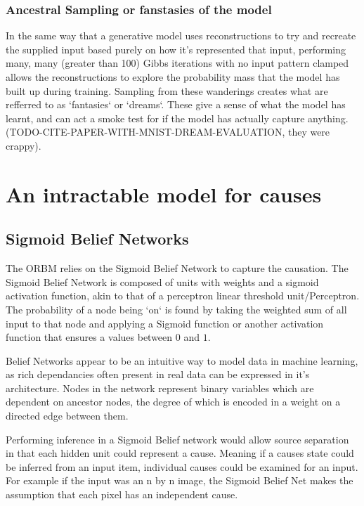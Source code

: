   \subsubsection{Ancestral Sampling or fanstasies of the model}
  \todo%
  In the same way that a generative model uses reconstructions to try and recreate the  supplied input based purely on how it's represented that input, performing many, many (greater than 100) Gibbs iterations with no input pattern clamped allows the reconstructions to explore the probability mass that the model has built up during training. Sampling from these wanderings creates what are refferred to as `fantasies` or `dreams`. These give a sense of what the model has learnt, and can act a smoke test for if the model has actually capture anything.
  (TODO-CITE-PAPER-WITH-MNIST-DREAM-EVALUATION, they were crappy).

  \section{An intractable model for causes}
    \subsection{Sigmoid Belief Networks}
    \todo%

    The ORBM relies on the Sigmoid Belief Network to capture the causation. The Sigmoid Belief Network is composed of units with weights and a sigmoid activation function, akin to that of a perceptron linear threshold unit/Perceptron. The probability of a node being `on` is found by taking the weighted sum of all input to that node and applying a Sigmoid function or another activation function that ensures a values between $0$ and $1$.

    Belief Networks appear to be an intuitive way to model data in machine learning, as rich dependancies often present in real data can be expressed in it's architecture. Nodes in the network represent binary variables which are dependent on ancestor nodes, the degree of which is encoded in a weight on a directed edge between them.

    Performing inference in a Sigmoid Belief network would allow source separation in that each hidden unit could represent a cause. Meaning if a causes state could be inferred from an input item, individual causes could be examined for an input. For example if the input was an n by n image, the Sigmoid Belief Net makes the assumption that each pixel has an independent cause.

